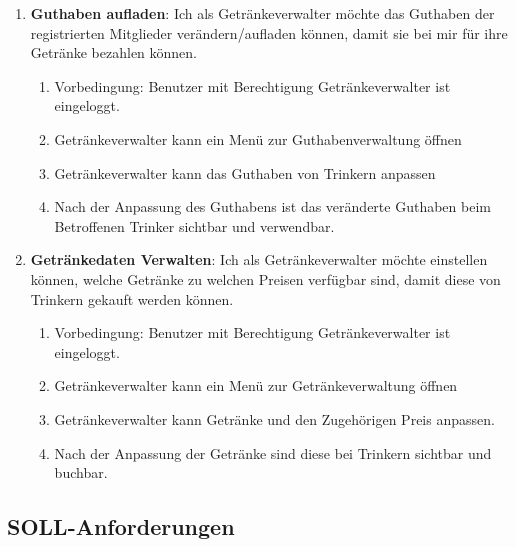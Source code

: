 \documentclass[conference,a4paper]{cs-techrep}
\begin{document}
\begin{enumerate}[{USM}1]
\item \textbf{Guthaben aufladen}: Ich als Getränkeverwalter möchte das Guthaben der registrierten Mitglieder verändern/aufladen können, damit sie bei mir für ihre Getränke bezahlen können.
\begin{enumerate}
	\item Vorbedingung: Benutzer mit Berechtigung Getränkeverwalter ist eingeloggt.
	\item Getränkeverwalter kann ein Menü zur Guthabenverwaltung öffnen
	\item Getränkeverwalter kann das Guthaben von Trinkern anpassen
	\item Nach der Anpassung des Guthabens ist das veränderte Guthaben beim Betroffenen Trinker sichtbar und verwendbar.
\end{enumerate}

\item \textbf{Getränkedaten Verwalten}: Ich als Getränkeverwalter möchte einstellen können, welche Getränke zu welchen Preisen verfügbar sind, damit diese von Trinkern gekauft werden können.
\begin{enumerate}
	\item Vorbedingung: Benutzer mit Berechtigung Getränkeverwalter ist eingeloggt.
	\item Getränkeverwalter kann ein Menü zur Getränkeverwaltung öffnen
	\item Getränkeverwalter kann Getränke und den Zugehörigen Preis anpassen.
	\item Nach der Anpassung der Getränke sind diese bei Trinkern sichtbar und buchbar.
\end{enumerate}

\end{enumerate}

\subsection{SOLL-Anforderungen}
\end{document}
